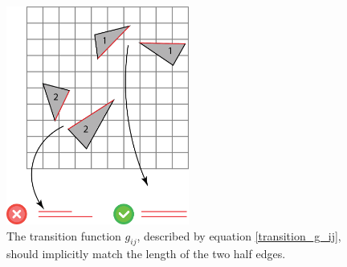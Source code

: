 \begin{figure}[ht]
\centering
\includegraphics[width=6cm]{figures/seamless/length.png}
\caption[The Length Requirement]{The transition function $g_{ij}$, described by equation \ref{transition_g_ij}, should implicitly match the length of the two half edges.}
\label{fig:length_req}
\end{figure}
